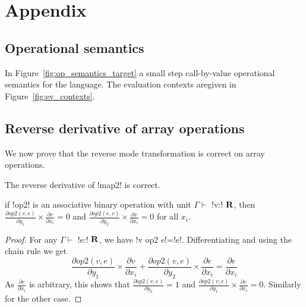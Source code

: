 \section{Appendix}

 \subsection{Operational semantics}

In Figure~\ref{fig:op_semantics_target} a small step call-by-value operational semantics for the language. 
The evaluation contexts aregiven in Figure~\ref{fig:ev_contexts}. 





 \subsection{Reverse derivative of array operations}

 \label{sub:Reverse derivative of array operations}

We now prove that the reverse mode transformation is correct on array operations. 

 \begin{proposition}
    The reverse derivative of !map2! is correct.
\end{proposition}


\begin{lemma}
    if !op2! is an associative binary operation with unit $\Gamma \vdash$ !v:! $\mathbf{R}$, then 
    $\frac{\partial op2(v,e)}{\partial y_1}\times\frac{\partial v}{\partial x_i}=0$ 
    and $\frac{\partial op2(e,v)}{\partial y_2}\times\frac{\partial v}{\partial x_i}=0$ for all $x_i$.
\end{lemma}

\begin{proof}
    For any $\Gamma \vdash$ !e:! $\mathbf{R}$, we have !v op2 e!=!e!.
    Differentiating and using the chain rule we get 
    $$\frac{\partial op2(v,e)}{\partial y_1}\times\frac{\partial v}{\partial x_i}
    +\frac{\partial op2(v,e)}{\partial y_2}\times\frac{\partial e}{\partial x_i}
    = \frac{\partial e}{\partial x_i}$$
As $\frac{\partial e}{\partial x_i}$ is arbitrary, 
this shows that $\frac{\partial op2(v,e)}{\partial y_2}=1$ and $\frac{\partial op2(v,e)}{\partial y_1}\times\frac{\partial v}{\partial x_i}=0$.
Similarly for the other case.
\end{proof}

